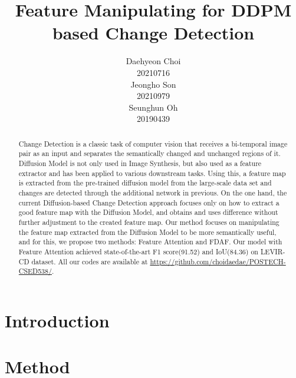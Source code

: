 \documentclass{article}
\title{Feature Manipulating for DDPM based Change Detection}
\author{%
  Daehyeon Choi\\
  20210716\\
  \And
  Jeongho Son\\
  20210979\\
  \And
  Seunghun Oh\\
  20190439\\
}
\begin{document}
\maketitle

\begin{abstract}
  Change Detection is a classic task of computer vision that receives a bi-temporal image pair as an input and separates the semantically changed and unchanged regions of it. Diffusion Model is not only used in Image Synthesis, but also used as a feature extractor and has been applied to various downstream tasks. Using this, a feature map is extracted from the pre-trained diffusion model from the large-scale data set and changes are detected through the additional network in previous. 
  On the one hand, the current Diffusion-based Change Detection approach focuses only on how to extract a good feature map with the Diffusion Model, and obtains and uses difference without further adjustment to the created feature map. Our method focuses on manipulating the feature map extracted from the Diffusion Model to be more semantically useful, and for this, we propose two methods: Feature Attention and FDAF. Our model with Feature Attention achieved state-of-the-art F1 score(91.52) and IoU(84.36) on LEVIR-CD dataset. All our codes are available at \href{https://github.com/choidaedae/POSTECH-CSED538/}{https://github.com/choidaedae/POSTECH-CSED538/}.
\end{abstract}


\section{Introduction}




\section{Method}
\end{document}
